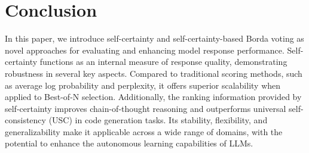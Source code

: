 


\section{Conclusion}
In this paper, we introduce self-certainty and self-certainty-based Borda voting as novel approaches for evaluating and enhancing model response performance. Self-certainty functions as an internal measure of response quality, demonstrating robustness in several key aspects. Compared to traditional scoring methods, such as average log probability and perplexity, it offers superior scalability when applied to Best-of-N selection. Additionally, the ranking information provided by self-certainty improves chain-of-thought reasoning and outperforms universal self-consistency (USC) in code generation tasks. Its stability, flexibility, and generalizability make it applicable across a wide range of domains, with the potential to enhance the autonomous learning capabilities of LLMs. 


